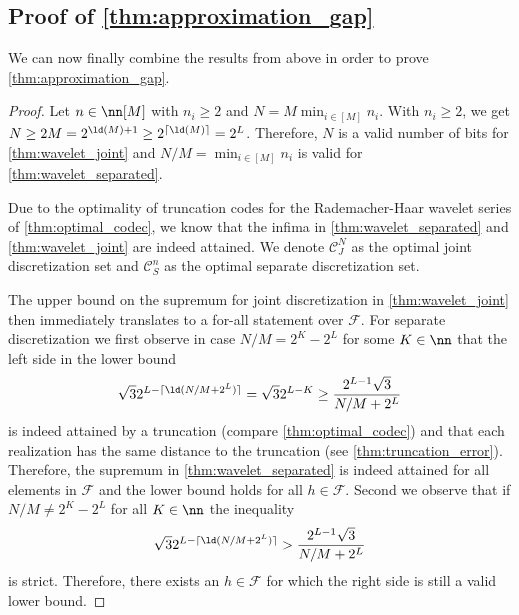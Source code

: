 \documentclass[twoside,11pt]{article}
\newcommand{\set}[1]{\ensuremath{\mathcal{#1}}}
\begin{document}
\subsection{Proof of \texorpdfstring{\cref{thm:approximation_gap}}{Main Theorem}}
\label{sec:proof_main_theorem}

We can now finally combine the results from above in order to prove \cref{thm:approximation_gap}.

\begin{proof}
    Let $n\in\nn[M]$ with $n_i\geq 2$ and $N=M\min_{i\in[M]}n_i$. With $n_i\geq 2$, we get $N\geq 2M=2^{\ld(M)+1}\geq2^{\lceil \ld(M)\rceil}=2^L$. Therefore, $N$ is a valid number of bits for \cref{thm:wavelet_joint} and $N/M=\min_{i\in[M]}n_i$ is valid for \cref{thm:wavelet_separated}.
    
   Due to the optimality of truncation codes for the Rademacher-Haar wavelet series of \cref{thm:optimal_codec}, we know that the infima in \cref{thm:wavelet_separated} and \cref{thm:wavelet_joint} are indeed attained.
    We denote $\set{C}_J^N$ as the optimal joint discretization set and $\set{C}_S^n$ as the optimal separate discretization set.

    The upper bound on the supremum for joint discretization in \cref{thm:wavelet_joint} then immediately translates to a for-all statement over $\set{F}$.
    For separate discretization we first observe in case $N/M=2^K-2^L$ for some $K\in\nn$ that the left side in the lower bound
    \begin{align}
        \sqrt{3}2^{L-\lceil\ld(N/M+2^L)\rceil}
        =
        \sqrt{3}2^{L-K}
        \geq
        \frac{2^{L-1}\sqrt{3}}{N/M+2^L}
    \end{align}
    is indeed attained by a truncation (compare \cref{thm:optimal_codec}) and that each realization has the same distance to the truncation (see \cref{thm:truncation_error}).
    Therefore, the supremum in \cref{thm:wavelet_separated} is indeed attained for all elements in $\set{F}$ and the lower bound holds for all $h\in\set{F}$.
    Second we observe that if $N/M\neq 2^K-2^L$ for all $K\in\nn$ the inequality
    \begin{align}
        \sqrt{3}
        2^{L-\lceil\ld(N/M+2^{L})\rceil}
        >
        \frac{2^{L-1}\sqrt{3}}{N/M+2^{L}}
    \end{align}
    is strict.
    Therefore, there exists an $h\in\set{F}$ for which the right side is still a valid lower bound.


\end{proof}
\end{document}
